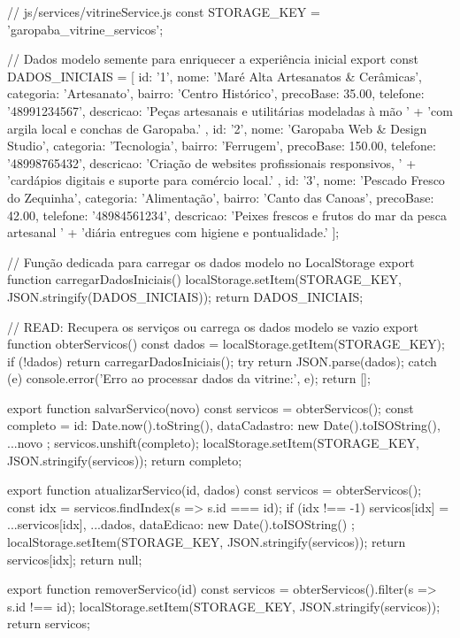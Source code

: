 \begin{boxCodigoJS}
// js/services/vitrineService.js
const STORAGE_KEY = 'garopaba_vitrine_servicos';

// Dados modelo semente para enriquecer a experiência inicial
export const DADOS_INICIAIS = [
  {
    id: '1',
    nome: 'Maré Alta Artesanatos & Cerâmicas',
    categoria: 'Artesanato',
    bairro: 'Centro Histórico',
    precoBase: 35.00,
    telefone: '48991234567',
    descricao: 'Peças artesanais e utilitárias modeladas à mão ' +
      'com argila local e conchas de Garopaba.'
  },
  {
    id: '2',
    nome: 'Garopaba Web & Design Studio',
    categoria: 'Tecnologia',
    bairro: 'Ferrugem',
    precoBase: 150.00,
    telefone: '48998765432',
    descricao: 'Criação de websites profissionais responsivos, ' +
      'cardápios digitais e suporte para comércio local.'
  },
  {
    id: '3',
    nome: 'Pescado Fresco do Zequinha',
    categoria: 'Alimentação',
    bairro: 'Canto das Canoas',
    precoBase: 42.00,
    telefone: '48984561234',
    descricao: 'Peixes frescos e frutos do mar da pesca artesanal ' +
      'diária entregues com higiene e pontualidade.'
  }
];

// Função dedicada para carregar os dados modelo no LocalStorage
export function carregarDadosIniciais() {
  localStorage.setItem(STORAGE_KEY, JSON.stringify(DADOS_INICIAIS));
  return DADOS_INICIAIS;
}

// READ: Recupera os serviços ou carrega os dados modelo se vazio
export function obterServicos() {
  const dados = localStorage.getItem(STORAGE_KEY);
  if (!dados) {
    return carregarDadosIniciais();
  }
  try {
    return JSON.parse(dados);
  } catch (e) {
    console.error('Erro ao processar dados da vitrine:', e);
    return [];
  }
}

export function salvarServico(novo) {
  const servicos = obterServicos();
  const completo = {
    id: Date.now().toString(),
    dataCadastro: new Date().toISOString(),
    ...novo
  };
  servicos.unshift(completo);
  localStorage.setItem(STORAGE_KEY, JSON.stringify(servicos));
  return completo;
}

export function atualizarServico(id, dados) {
  const servicos = obterServicos();
  const idx = servicos.findIndex(s => s.id === id);
  if (idx !== -1) {
    servicos[idx] = { ...servicos[idx], ...dados,
                      dataEdicao: new Date().toISOString() };
    localStorage.setItem(STORAGE_KEY, JSON.stringify(servicos));
    return servicos[idx];
  }
  return null;
}

export function removerServico(id) {
  const servicos = obterServicos().filter(s => s.id !== id);
  localStorage.setItem(STORAGE_KEY, JSON.stringify(servicos));
  return servicos;
}
\end{boxCodigoJS}


